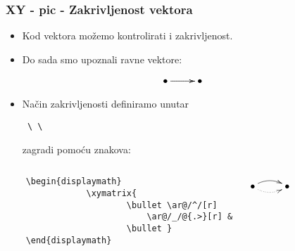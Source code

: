 \documentclass[9pt]{beamer}
\begin{document}
\begin{frame}[fragile]
    \frametitle{XY - pic - Zakrivljenost vektora}
    
    \begin{itemize} 
        \item Kod vektora možemo kontrolirati i zakrivljenost.
        \item Do sada smo upoznali ravne vektore:
    \end{itemize}
    \begin{displaymath}
            \xymatrix{ \bullet \ar[r] \ar@{.>}[r] & \bullet }
    \end{displaymath}
    \begin{itemize}
		\item Način zakrivljenosti definiramo unutar \begin{verbatim} \ \ \end{verbatim} zagradi pomoću  znakova:
    \end{itemize}


    \begin{columns}
    \begin{verbatim}
    \begin{displaymath}
                \xymatrix{
                        \bullet \ar@/^/[r]
                            \ar@/_/@{.>}[r] &
                        \bullet }
    \end{displaymath}
    \end{verbatim}
    \begin{displaymath}
                \xymatrix{
                        \bullet \ar@/^/[r]
                           \ar@/_/@{.>}[r] &
                        \bullet }
\end{displaymath}
\end{columns}

\end{frame}
\end{document}
